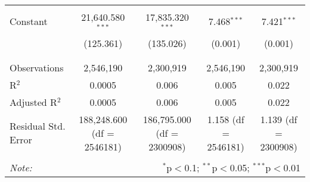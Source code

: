 \begin{table}[H]
{\begin{tabular}{@{\extracolsep{5pt}}lcccc}
   & & & & \\  

  Constant & 21,640.580$^{***}$ & 17,835.320$^{***}$ & 7.468$^{***}$ & 7.421$^{***}$ \\  

   & (125.361) & (135.026) & (0.001) & (0.001) \\  

   & & & & \\  

 \hline \\[-1.8ex]  

 Observations & 2,546,190 & 2,300,919 & 2,546,190 & 2,300,919 \\  

 R$^{2}$ & 0.0005 & 0.006 & 0.005 & 0.022 \\  

 Adjusted R$^{2}$ & 0.0005 & 0.006 & 0.005 & 0.022 \\  

 Residual Std. Error & 188,248.600 (df = 2546181) & 186,795.000 (df = 2300908) & 1.158 (df = 2546181) & 1.139 (df = 2300908) \\  

 \hline  

 \hline \\[-1.8ex]  

 \textit{Note:}  & \multicolumn{4}{r}{$^{*}$p$<$0.1; $^{**}$p$<$0.05; $^{***}$p$<$0.01} \\  

 \end{tabular}}  

 \end{table}  

